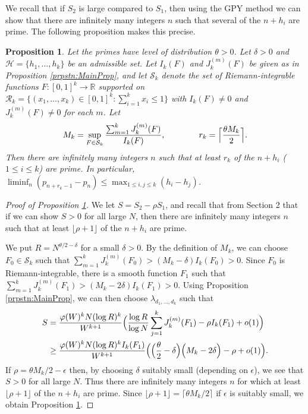 \documentclass[12pt,a4paper]{amsart}
\theoremstyle{plain}
\newtheorem{prpstn}[thrm]{Proposition}
\numberwithin{sblmm}{thrm}
\numberwithin{equation}{section}
\renewcommand{\phi}{\varphi}
\begin{document}
We recall that if $S_2$ is large compared to $S_1$, then using the GPY method we can show that there are infinitely many integers $n$ such that several of the $n+h_i$ are prime. The following proposition makes this precise.
\begin{prpstn}\label{prpstn:Explicit}
Let the primes have level of distribution $\theta>0$. Let $\delta>0$ and $\mathcal{H}=\{h_1,\dotsc,h_k\}$ be an admissible set. Let $I_k(F)$ and $J_k^{(m)}(F)$ be given as in Proposition \ref{prpstn:MainProp}, and let $\mathcal{S}_k$ denote the set of Riemann-integrable functions $F:[0,1]^k\rightarrow\mathbb{R}$ supported on $\mathcal{R}_k=\{(x_1,\dotsc,x_k)\in[0,1]^k:\sum_{i=1}^kx_i\le 1\}$ with $I_k(F)\ne 0$ and $J_k^{(m)}(F)\ne 0$ for each $m$. Let
\[M_k=\sup_{F\in\mathcal{S}_k}\frac{\sum_{m=1}^kJ_k^{(m)}(F)}{I_k(F)},\qquad\qquad r_k=\Bigl\lceil\frac{\theta M_k}{2}\Bigr\rceil.\]
Then there are infinitely many integers $n$ such that at least $r_k$ of the $n+h_i$ ($1\le i\le k$) are prime. In particular, $\liminf_n(p_{n+r_k-1}-p_n)\le \max_{1\le i,j\le k}(h_i-h_j)$.
\end{prpstn}
\begin{proof}[Proof of Proposition \ref{prpstn:Explicit}]
We let $S=S_2-\rho S_1$, and recall that from Section 2 that if we can show $S>0$ for all large $N$, then there are infinitely many integers $n$ such that at least $\lfloor \rho+1\rfloor$ of the $n+h_i$ are prime. 

We put $R=N^{\theta/2-\delta}$ for a small $\delta>0$. By the definition of $M_k$, we can choose $F_0\in\mathcal{S}_k$ such that $\sum_{m=1}^kJ_k^{(m)}(F_0)>(M_k-\delta)I_k(F_0)>0$. Since $F_0$ is Riemann-integrable, there is a smooth function $F_1$ such that $\sum_{m=1}^kJ_k^{(m)}(F_1)>(M_k-2\delta)I_k(F_1)>0$. Using Proposition \ref{prpstn:MainProp}, we can then choose $\lambda_{d_1,\dotsc,d_k}$ such that
\begin{align}
S&=\frac{\phi(W)^kN(\log{R})^k}{W^{k+1}}\Bigl(\frac{\log{R}}{\log{N}}\sum_{j=1}^kJ_k^{(m)}(F_1)-\rho I_k(F_1)+o(1)\Bigr)\nonumber\\
&\ge \frac{\phi(W)^kN(\log{R})^k I_k(F_1)}{W^{k+1}}\Bigl(\Bigl(\frac{\theta}{2}-\delta\Bigr)\Bigl(M_k-2\delta\Bigr)-\rho+o(1)\Bigr).
\end{align}
If $\rho=\theta M_k/2-\epsilon$ then, by choosing $\delta$ suitably small (depending on $\epsilon$), we see that $S>0$ for all large $N$. Thus there are infinitely many integers $n$ for which at least $\lfloor \rho+1\rfloor$ of the $n+h_i$ are prime. Since $\lfloor \rho+1\rfloor= \lceil \theta M_k/2\rceil$ if $\epsilon$ is suitably small, we obtain Proposition \ref{prpstn:Explicit}.
\end{proof}
\end{document}
